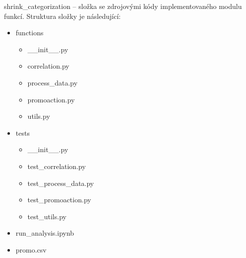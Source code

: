 \documentclass[a4paper,oneside,12pt]{book}
\begin{document}
shrink\_categorization -- složka se zdrojovými kódy implementovaného modulu funkcí. Struktura složky je následující:
\begin{itemize}
  \itemsep0em
  \item functions
  \begin{itemize}
    \itemsep0em
    \item \_\_init\_\_.py
    \item correlation.py
    \item process\_data.py
    \item promoaction.py
    \item utils.py
  \end{itemize}
  \item tests
  \begin{itemize}
    \itemsep0em
    \item \_\_init\_\_.py
    \item test\_correlation.py
    \item test\_process\_data.py
    \item test\_promoaction.py
    \item test\_utils.py
  \end{itemize}
  \item run\_analysis.ipynb
  \item promo.csv
\end{itemize}
\end{document}
